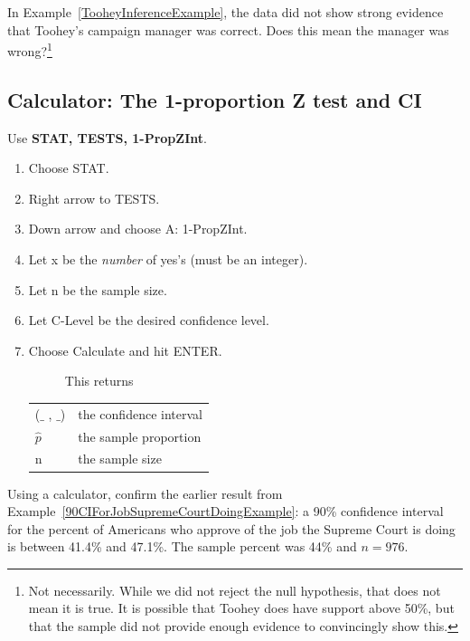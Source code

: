 \begin{exercise}
In Example~\ref{TooheyInferenceExample}, the data did not show strong evidence that Toohey's campaign manager was correct. Does this mean the manager was wrong?\footnote{Not necessarily. While we did not reject the null hypothesis, that does not mean it is true. It is possible that Toohey does have support above 50\%, but that the sample did not provide enough evidence to convincingly show this.}
\end{exercise}


\subsection{Calculator: The 1-proportion Z test and CI\vspace{-3mm}}


\begin{termBox}{
Use \textbf{STAT, TESTS, 1-PropZInt}.
\begin{enumerate}
\setlength{\itemsep}{0mm}
\item Choose STAT.
\item Right arrow to TESTS.
\item Down arrow and choose A: 1-PropZInt.
\item Let x be the \emph{number} of yes's (must be an integer).
\item Let n be the sample size.
\item Let C-Level be the desired confidence level.
\item Choose Calculate and hit ENTER.
\begin{description}
\item[] This returns
\end{description}
\begin{tabular}{l l}
($\_$ , $\_$)
	&\quad  the confidence interval \\
$\hat{p}$
	&\quad	the sample proportion \\
n
	&\quad	the sample size
\end{tabular}
\end{enumerate}
}
\end{termBox}

\begin{exercise}
Using a calculator, confirm the earlier result from Example~\ref{90CIForJobSupremeCourtDoingExample}: a 90\% confidence interval for the percent of Americans who approve of the job the Supreme Court is doing is between 41.4\% and 47.1\%.  The sample percent was 44\% and $n = 976$.
\end{exercise}


